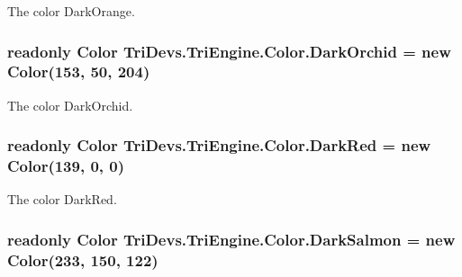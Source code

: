 The color Dark\-Orange. 

\hypertarget{struct_tri_devs_1_1_tri_engine_1_1_color_a1a7243e0a7ae67b867652883572d8ac5}{
\subsubsection[{Dark\-Orchid}]{\setlength{\rightskip}{0pt plus 5cm}readonly {\bf Color} Tri\-Devs.\-Tri\-Engine.\-Color.\-Dark\-Orchid = new {\bf Color}(153, 50, 204)\hspace{0.3cm}{\ttfamily [static]}}}\label{struct_tri_devs_1_1_tri_engine_1_1_color_a1a7243e0a7ae67b867652883572d8ac5}


The color Dark\-Orchid. 

\hypertarget{struct_tri_devs_1_1_tri_engine_1_1_color_a3b1add606f86df6acc09be7ba1ca8431}{
\subsubsection[{Dark\-Red}]{\setlength{\rightskip}{0pt plus 5cm}readonly {\bf Color} Tri\-Devs.\-Tri\-Engine.\-Color.\-Dark\-Red = new {\bf Color}(139, 0, 0)\hspace{0.3cm}{\ttfamily [static]}}}\label{struct_tri_devs_1_1_tri_engine_1_1_color_a3b1add606f86df6acc09be7ba1ca8431}


The color Dark\-Red. 

\hypertarget{struct_tri_devs_1_1_tri_engine_1_1_color_aeeac5e9a1c6cd995bed67588b2860361}{
\subsubsection[{Dark\-Salmon}]{\setlength{\rightskip}{0pt plus 5cm}readonly {\bf Color} Tri\-Devs.\-Tri\-Engine.\-Color.\-Dark\-Salmon = new {\bf Color}(233, 150, 122)\hspace{0.3cm}{\ttfamily [static]}}}\label{struct_tri_devs_1_1_tri_engine_1_1_color_aeeac5e9a1c6cd995bed67588b2860361}


